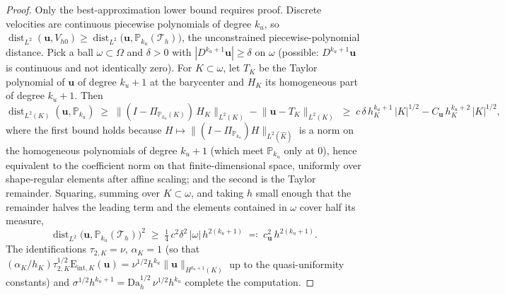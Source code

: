 \documentclass[11pt]{article}
\theoremstyle{remark}
\newcommand{\bu}{\boldsymbol{u}}
\newcommand{\norm}[1]{\lVert #1 \rVert}
\newcommand{\Eint}[2]{\mathrm{E}_{\mathrm{int},#1}(#2)}
\begin{document}
\begin{proof}
Only the best-approximation lower bound requires proof. Discrete velocities are
continuous piecewise polynomials of degree $k_u$, so
$\operatorname{dist}_{L^2}(\bu, V_{h0}) \ge
\operatorname{dist}_{L^2}\bigl(\bu, \mathbb P_{k_u}(\mathcal T_h)\bigr)$, the
unconstrained piecewise-polynomial distance. Pick a ball $\omega \subset \Omega$
and $\delta > 0$ with $|D^{k_u+1}\bu| \ge \delta$ on $\omega$ (possible:
$D^{k_u+1}\bu$ is continuous and not identically zero). For $K \subset \omega$, let
$T_K$ be the Taylor polynomial of $\bu$ of degree $k_u{+}1$ at the barycenter and
$H_K$ its homogeneous part of degree $k_u{+}1$. Then
\[
  \operatorname{dist}_{L^2(K)}(\bu, \mathbb P_{k_u})
  \;\ge\; \bigl\lVert (I - \Pi_{\mathbb P_{k_u}(K)})\,H_K \bigr\rVert_{L^2(K)}
  - \norm{\bu - T_K}_{L^2(K)}
  \;\ge\; c\,\delta\, h_K^{k_u+1}\,|K|^{1/2} - C_{\bu}\, h_K^{k_u+2}\,|K|^{1/2},
\]
where the first bound holds because
$H \mapsto \lVert (I - \Pi_{\mathbb P_{k_u}}) H \rVert_{L^2(\widehat K)}$ is a norm
on the homogeneous polynomials of degree $k_u{+}1$ (which meet
$\mathbb P_{k_u}$ only at $0$), hence equivalent to the coefficient norm on that
finite-dimensional space, uniformly over shape-regular elements after affine
scaling; and the second is the Taylor remainder. Squaring, summing over
$K \subset \omega$, and taking $h$ small enough that the remainder halves the
leading term and the elements contained in $\omega$ cover half its measure,
\[
  \operatorname{dist}_{L^2}\bigl(\bu, \mathbb P_{k_u}(\mathcal T_h)\bigr)^2
  \;\ge\; \tfrac14\, c^2\delta^2\, |\omega|\, h^{2(k_u+1)}
  \;\eqqcolon\; c_{\bu}^2\, h^{2(k_u+1)}.
\]
The identifications $\tau_{2,K} = \nu$, $\alpha_K = 1$ (so that
$(\alpha_K/h_K)\tau_{2,K}^{1/2}\Eint{K}{\bu} = \nu^{1/2}h^{k_u}
\norm{\bu}_{H^{k_u+1}(K)}$ up to the quasi-uniformity constants) and
$\sigma^{1/2}h^{k_u+1} = \mathrm{Da}_h^{1/2}\,\nu^{1/2}h^{k_u}$ complete the
computation.
\end{proof}
\end{document}
